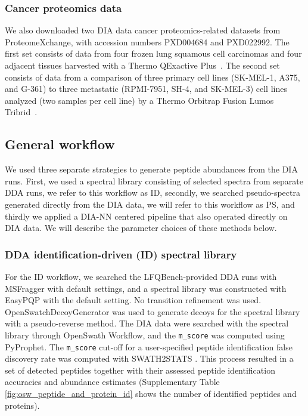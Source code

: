 \documentclass[10pt,letterpaper]{article}
\begin{document}
\subsubsection*{Cancer proteomics data}

We also downloaded two DIA data cancer proteomics-related datasets from ProteomeXchange, with accession numbers PXD004684 and PXD022992.  The first set consists of data from four frozen lung squamous cell carcinomas and four adjacent tissues harvested with a Thermo QExactive Plus~\cite{stewart2017relative}. The second set consists of data from a comparison of three primary cell lines (SK-MEL-1, A375, and G-361) to three metastatic (RPMI-7951, SH-4, and SK-MEL-3) cell lines analyzed (two samples per cell line) by a Thermo Orbitrap Fusion Lumos Tribrid~\cite{gao2021data}. 

\subsection*{General workflow}

We used three separate strategies to generate peptide abundances from the DIA runs. First, we used a spectral library consisting of selected spectra from separate DDA runs, we refer to this workflow as ID, secondly, we searched pseudo-spectra generated directly from the DIA data, we will refer to this workflow as PS, and thirdly we applied a DIA-NN centered pipeline that also operated directly on DIA data.  We will describe the parameter choices of these methods below.


\subsubsection*{DDA identification-driven (ID) spectral library}

For the ID workflow, we searched the LFQBench-provided DDA runs with MSFragger\cite{kong2017msfragger} with default settings, and a spectral library was constructed with EasyPQP \cite{easypqp} with the default setting. No transition refinement was used. OpenSwatchDecoyGenerator was used to generate decoys for the spectral library with a pseudo-reverse method. The DIA data were searched with the spectral library through OpenSwath Workflow, and the \texttt{m\_score} was computed using PyProphet\cite{teleman2015diana}. The \texttt{m\_score} cut-off for a user-specified peptide identification false discovery rate was computed with SWATH2STATS \cite{blattmann2016swath2stats}. This process resulted in a set of detected peptides together with their assessed peptide identification accuracies and abundance estimates (Supplementary Table \ref{fig:osw_peptide_and_protein_id} shows the number of identified peptides and proteins).
\end{document}
